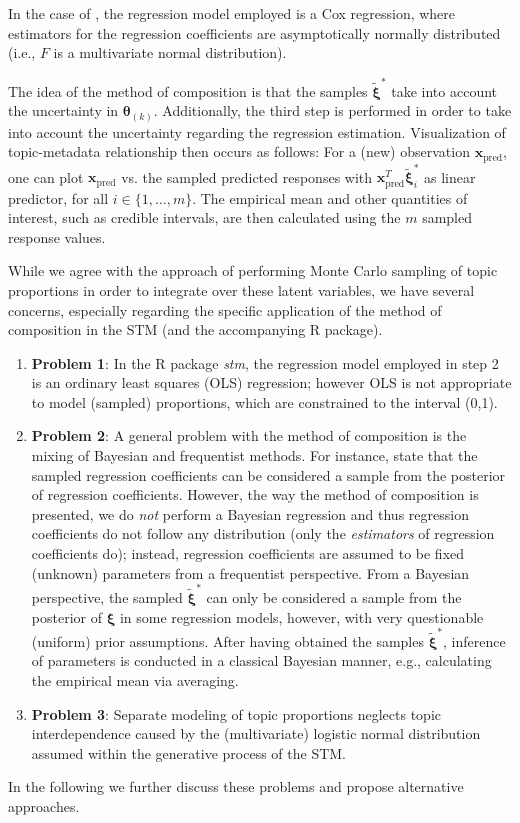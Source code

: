 In the case of \cite{treier2008democracy}, the regression model employed is a Cox regression, where estimators for the regression coefficients are asymptotically normally distributed (i.e., $F$ is a multivariate normal distribution).

The idea of the method of composition is that the samples $\tilde{\boldsymbol{\xi}}^*$ take into account the uncertainty in $\boldsymbol{\theta}_{(k)}$. Additionally, the third step is performed in order to take into account the uncertainty regarding the regression estimation. Visualization of topic-metadata relationship then occurs as follows: For a (new) observation $\boldsymbol{x}_{\text{pred}}$, one can plot $\boldsymbol{x}_{\text{pred}}$ vs. the sampled predicted responses with $\boldsymbol{x}_{\text{pred}}^T \tilde{\boldsymbol{\xi}}_i^*$ as linear predictor, for all $i \in \{1,\dots,m\}$. The empirical mean and other quantities of interest, such as credible intervals, are then calculated using the $m$ sampled response values.

While we agree with the approach of performing Monte Carlo sampling of topic proportions in order to integrate over these latent variables, we have several concerns, especially regarding the specific application of the method of composition in the STM (and the accompanying R package).
\begin{enumerate}
\item \textbf{Problem 1}: In the R package \textit{stm}, the regression model employed in step 2 is an ordinary least squares (OLS) regression; however OLS is not appropriate to model (sampled) proportions, which are constrained to the interval (0,1).
\item \textbf{Problem 2}: A general problem with the method of composition is the mixing of Bayesian and frequentist methods. For instance, \cite{treier2008democracy} state that the sampled regression coefficients can be considered a sample from the posterior of regression coefficients. However, the way the method of composition is presented, we do \textit{not} perform a Bayesian regression and thus regression coefficients do not follow any distribution (only the \textit{estimators} of regression coefficients do); instead, regression coefficients are assumed to be fixed (unknown) parameters from a frequentist perspective. From a Bayesian perspective, the sampled $\tilde{\boldsymbol{\xi}}^*$ can only be considered a sample from the posterior of $\boldsymbol{\xi}$ in some regression models, however, with very questionable (uniform) prior assumptions. After having obtained the samples $\tilde{\boldsymbol{\xi}}^*$, inference of parameters is conducted in a classical Bayesian manner, e.g., calculating the empirical mean via averaging.
\item \textbf{Problem 3}: Separate modeling of topic proportions neglects topic interdependence caused by the (multivariate) logistic normal distribution assumed within the generative process of the STM.
\end{enumerate}
In the following we further discuss these problems and propose alternative approaches.

